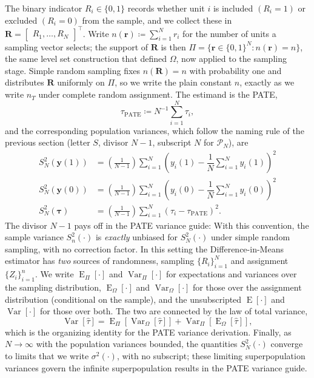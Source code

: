 \documentclass[12pt,leqno]{article}
\theoremstyle{newstyle}
\DeclareMathOperator{\E}{\mathrm{E}}
\DeclareMathOperator{\Var}{\mathrm{Var}}
\newcommand{\bZ}{\bm{Z}}   \newcommand{\bz}{\bm{z}}   %
\newcommand{\bR}{\bm{R}}   \newcommand{\br}{\bm{r}}   %
\newcommand{\EZ}{\E_{\Omega}}    \newcommand{\VarZ}{\Var_{\Omega}}  %
\newcommand{\ER}{\E_{\Pi}}       \newcommand{\VarR}{\Var_{\Pi}}     %
\newcommand{\po}[2]{y_{#1}(#2)}     %
\newcommand{\pov}[1]{\bm{y}(#1)}    %
\newcommand{\tauP}{\tau_{\text{PATE}}}
\newcommand{\tauhat}{\hat{\tau}}
\newcommand{\Ssq}[2][n]{S_{#1}^{2}(#2)}
\newcommand{\ssq}[2][n]{\sigma_{#1}^{2}(#2)}
\begin{document}
The binary indicator $R_i \in \{0, 1\}$ records whether unit $i$ is included $(R_i = 1)$ or excluded $(R_i = 0)$ from the sample, and we collect these in $\bR = \begin{bmatrix} R_1, \dots , R_N\end{bmatrix}^\top$. Write $n(\br) \coloneqq \sum_{i = 1}^N r_i$ for the number of units a sampling vector selects; the support of $\bR$ is then $\Pi = \{\br \in \{0,1\}^N: n(\br) = n\}$, the same level set construction that defined $\Omega$, now applied to the sampling stage. Simple random sampling fixes $n(\bR) = n$ with probability one and distributes $\bR$ uniformly on $\Pi$, so we write the plain constant $n$, exactly as we write $n_T$ under complete random assignment. The estimand is the PATE,
\begin{equation*}
\tauP \coloneqq N^{-1} \sum \limits_{i = 1}^N \tau_i,
\end{equation*}
and the corresponding population variances, which follow the naming rule of the previous section (letter $S$, divisor $N - 1$, subscript $N$ for $\mathcal{P}_N$), are
\begin{align*}
\Ssq[N]{\pov{1}} & = \left(\frac{1}{N - 1}\right)\sum \limits_{i = 1}^{N} \left(\po{i}{1} - \dfrac{1}{N} \sum \limits_{i = 1}^{N} \po{i}{1}\right)^2 \\
\Ssq[N]{\pov{0}} & = \left(\frac{1}{N - 1}\right)\sum \limits_{i = 1}^{N} \left(\po{i}{0} - \dfrac{1}{N} \sum \limits_{i = 1}^{N} \po{i}{0}\right)^2 \\
\Ssq[N]{\bm{\tau}} & = \left(\frac{1}{N - 1}\right) \sum \limits_{i = 1}^{N} \left(\tau_i - \tauP\right)^2.
\end{align*}
The divisor $N - 1$ pays off in the PATE variance guide: With this convention, the sample variance $\Ssq{\cdot}$ is \textit{exactly} unbiased for $\Ssq[N]{\cdot}$ under simple random sampling, with no correction factor.
In this setting the Difference-in-Means estimator has \textit{two} sources of randomness, sampling $\{R_i\}_{i = 1}^N$ and assignment $\{Z_i\}_{i = 1}^n$. We write $\ER[\cdot]$ and $\VarR[\cdot]$ for expectations and variances over the sampling distribution, $\EZ[\cdot]$ and $\VarZ[\cdot]$ for those over the assignment distribution (conditional on the sample), and the unsubscripted $\E[\cdot]$ and $\Var[\cdot]$ for those over both. The two are connected by the law of total variance,
\begin{equation*}
\Var\left[\tauhat\right] = \ER\left[\VarZ\left[\tauhat\right]\right] + \VarR\left[\EZ\left[\tauhat\right]\right],
\end{equation*}
which is the organizing identity for the PATE variance derivation. Finally, as $N \to \infty$ with the population variances bounded, the quantities $\Ssq[N]{\cdot}$ converge to limits that we write $\ssq[]{\cdot}$, with no subscript; these limiting superpopulation variances govern the infinite superpopulation results in the PATE variance guide.

\begin{singlespace}


\end{singlespace}
\end{document}
